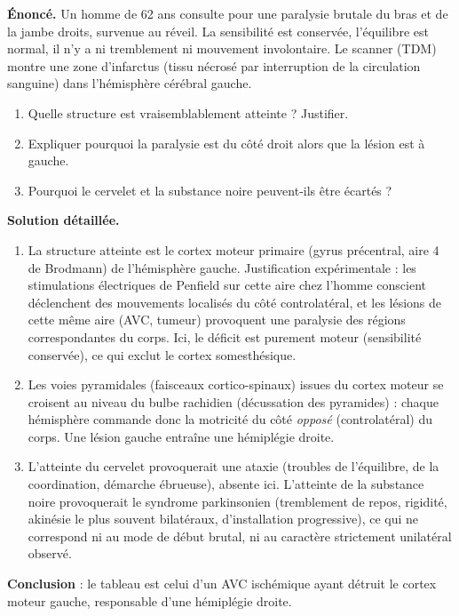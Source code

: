 \documentclass[11pt]{article}
\newcommand{\cle}[1]{{\popxbold\color{popdark}#1}}
\begin{document}
\begin{exoresolu}
\textbf{Énoncé.} Un homme de 62 ans consulte pour une paralysie brutale du bras et de la jambe droits, survenue au réveil. La sensibilité est conservée, l'équilibre est normal, il n'y a ni tremblement ni mouvement involontaire. Le scanner (TDM) montre une zone d'infarctus (tissu nécrosé par interruption de la circulation sanguine) dans l'hémisphère cérébral gauche.
\begin{enumerate}
\item Quelle structure est vraisemblablement atteinte ? Justifier.
\item Expliquer pourquoi la paralysie est du côté droit alors que la lésion est à gauche.
\item Pourquoi le cervelet et la substance noire peuvent-ils être écartés ?
\end{enumerate}
\tcblower
\textbf{Solution détaillée.}
\begin{enumerate}
\item La structure atteinte est le \cle{cortex moteur primaire} (gyrus précentral, aire 4 de Brodmann) de l'hémisphère gauche. Justification expérimentale : les stimulations électriques de Penfield sur cette aire chez l'homme conscient déclenchent des mouvements localisés du côté controlatéral, et les lésions de cette même aire (AVC, tumeur) provoquent une paralysie des régions correspondantes du corps. Ici, le déficit est purement moteur (sensibilité conservée), ce qui exclut le cortex somesthésique.
\item Les voies pyramidales (faisceaux cortico-spinaux) issues du cortex moteur se croisent au niveau du bulbe rachidien (\cle{décussation des pyramides}) : chaque hémisphère commande donc la motricité du côté \emph{opposé} (controlatéral) du corps. Une lésion gauche entraîne une hémiplégie droite.
\item L'atteinte du cervelet provoquerait une ataxie (troubles de l'équilibre, de la coordination, démarche ébrueuse), absente ici. L'atteinte de la substance noire provoquerait le syndrome parkinsonien (tremblement de repos, rigidité, akinésie le plus souvent bilatéraux, d'installation progressive), ce qui ne correspond ni au mode de début brutal, ni au caractère strictement unilatéral observé.
\end{enumerate}
\textbf{Conclusion} : le tableau est celui d'un AVC ischémique ayant détruit le cortex moteur gauche, responsable d'une hémiplégie droite.
\end{exoresolu}
\end{document}

